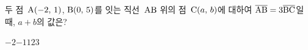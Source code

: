 두 점~$\mathrm{A}(-2,\mkern3mu 1)$, $\mathrm{B}(0,\mkern3mu 5)$를 잇는 직선~$\mathrm{AB}$ 위의 점~$\mathrm{C}(a,\mkern3mu b)$에 대하여 $\overline{\mathrm{AB}}=3\overline{\mathrm{BC}}$일 때, $a+b$의 값은? 
\begin{choices32}{$-2$}{$-1$}{$1$}{$2$}{$3$}\end{choices32}

